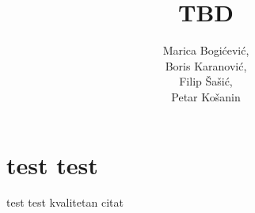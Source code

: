 \documentclass[a4paper]{article}
\title{TBD}
\author{
	Marica Bogićević, \\
	Boris Karanović, \\ 
	Filip Šašić, \\
	Petar Košanin	
}
\begin{document}
\maketitle
\newpage
\tableofcontents
\newpage

\section{test test}
test test
kvalitetan citat \cite{luecken2019current}

\newpage


\end{document}
